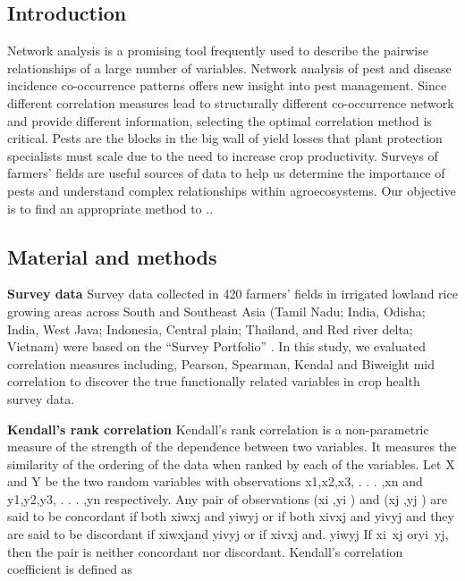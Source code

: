 
\subsection*{Introduction}

Network analysis is a promising tool frequently used to describe the pairwise relationships of a large number of variables. Network analysis of pest and disease incidence co-occurrence patterns offers new insight into pest management. Since different correlation measures lead to structurally different co-occurrence network and provide different information, selecting the optimal correlation method is critical. Pests are the blocks in the big wall of yield losses that plant protection specialists must scale due to the need to increase crop productivity. Surveys of farmers’ fields are useful sources of data to help us determine the importance of pests and understand complex relationships within agroecosystems. Our objective is to find an appropriate method to ..

% 

\subsection*{Material and methods}
\textbf{Survey data}
Survey data collected in 420 farmers’ fields in irrigated lowland rice growing areas across South and Southeast Asia (Tamil Nadu; India, Odisha; India, West Java; Indonesia, Central plain; Thailand, and Red river delta; Vietnam) were based on the “Survey Portfolio” . In this study, we evaluated correlation measures including, Pearson, Spearman, Kendal and Biweight mid correlation to discover the true functionally related variables in crop health survey data.




\textbf{Kendall’s rank correlation}
Kendall’s rank correlation is a non-parametric measure of the strength of the dependence between two variables. It measures the similarity of the ordering of the data when ranked by each of the variables.
Let X and Y be the two random variables with observations x1,x2,x3, . . . ,xn and y1,y2,y3, . . . ,yn respectively. Any pair of observations (xi ,yi ) and (xj ,yj ) are said to be concordant if both xiwxj and yiwyj or if both xivxj and yivyj and they are said to be discordant if xiwxjand yivyj or if xivxj and. yiwyj If xi~xj oryi~yj, then the pair is neither concordant nor discordant.
Kendall’s correlation coefficient is defined as 


